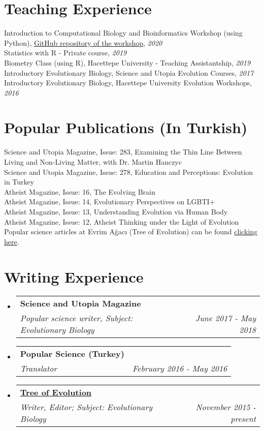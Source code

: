 \documentclass[letterpaper,11pt]{article}
\makeatletter
\newcommand{\resumeSubheading}[4]{
  \vspace{-1pt}\item
    \begin{tabular*}{0.97\textwidth}{l@{\extracolsep{\fill}}r}
      \textbf{#1} & #2 \\
      \textit{\small#3} & \textit{\small #4} \\
    \end{tabular*}\vspace{-5pt}
}
\newcommand{\resumeSubHeadingListStart}{\begin{itemize}[leftmargin=*]}
\newcommand{\resumeSubHeadingListEnd}{\end{itemize}}
\makeatother
\begin{document}
\section{Teaching Experience}
Introduction to Computational Biology and Bioinformatics Workshop (using Python), \href{https://github.com/isinaltinkaya/Hesaplamali_Biyoloji_ve_Biyoinformatige_Giris_2020}{GitHub repository of the workshop}, \textit{2020}\\
Statistics with R - Private course, \textit{2019} \\
Biometry Class (using R), Hacettepe University - Teaching Assistantship, \textit{2019} \\
Introductory Evolutionary Biology, Science and Utopia Evolution Courses, \textit{2017} \\
Introductory Evolutionary Biology, Hacettepe University Evolution Workshops, \textit{2016} \\


\section{Popular Publications (In Turkish)}
Science and Utopia Magazine, Issue: 283, Examining the Thin Line Between Living and Non-Living Matter, with Dr. Martin Hanczyc \\
Science and Utopia Magazine, Issue: 278, Education and Perceptions: Evolution in Turkey \\
Atheist Magazine, Issue: 16, The Evolving Brain \\
Atheist Magazine, Issue: 14, Evolutionary Perspectives on LGBTI+ \\
Atheist Magazine, Issue: 13, Understanding Evolution via Human Body \\
Atheist Magazine, Issue: 12, Atheist Thinking under the Light of Evolution \\
Popular science articles at Evrim A\u{g}ac{\i} (Tree of Evolution) can be found  \href{https://evrimagaci.org/isinaltinkaya/}{clicking here}.

\section{Writing Experience}
  \resumeSubHeadingListStart
    \resumeSubheading
      {Science and Utopia Magazine}{ }
      {Popular science writer, Subject: Evolutionary Biology}{June 2017 - May 2018}
    \resumeSubheading
      {Popular Science (Turkey)}{ }
      {Translator}{February 2016 - May 2016}
    \resumeSubheading
      {\href{https://evrimagaci.org/isinaltinkaya/}{Tree of Evolution}}{}
      {Writer, Editor; Subject: Evolutionary Biology}{November 2015 - present}
  \resumeSubHeadingListEnd
\end{document}
